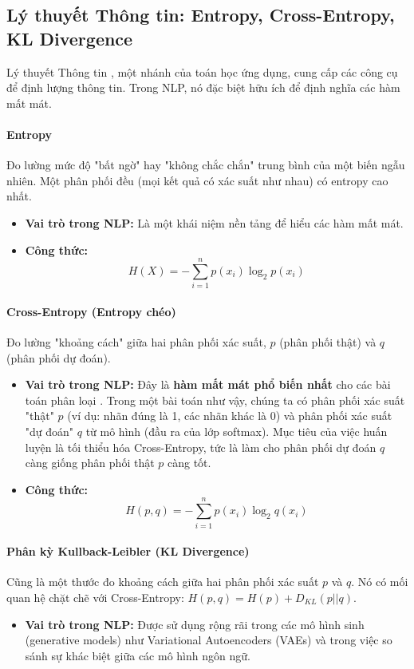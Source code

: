 \subsection{Lý thuyết Thông tin: Entropy, Cross-Entropy, KL Divergence}
\label{ssec:ly_thuyet_thong_tin}
Lý thuyết Thông tin \cite{shannon1948mathematical}, một nhánh của toán học ứng dụng, cung cấp các công cụ để định lượng thông tin. Trong NLP, nó đặc biệt hữu ích để định nghĩa các hàm mất mát.

\paragraph{Entropy}
Đo lường mức độ "bất ngờ" hay "không chắc chắn" trung bình của một biến ngẫu nhiên. Một phân phối đều (mọi kết quả có xác suất như nhau) có entropy cao nhất.
\begin{itemize}
    \item \textbf{Vai trò trong NLP:} Là một khái niệm nền tảng để hiểu các hàm mất mát.
    \item \textbf{Công thức:}
        \begin{equation}
            H(X) = -\sum_{i=1}^{n} p(x_i) \log_2 p(x_i)
            \label{eq:entropy}
        \end{equation}
\end{itemize}

\paragraph{Cross-Entropy (Entropy chéo)}
Đo lường "khoảng cách" giữa hai phân phối xác suất, $p$ (phân phối thật) và $q$ (phân phối dự đoán).
\begin{itemize}
    \item \textbf{Vai trò trong NLP:} Đây là \textbf{hàm mất mát phổ biến nhất} cho các bài toán phân loại \cite{goodfellow2016deep}. Trong một bài toán như vậy, chúng ta có phân phối xác suất "thật" $p$ (ví dụ: nhãn đúng là 1, các nhãn khác là 0) và phân phối xác suất "dự đoán" $q$ từ mô hình (đầu ra của lớp softmax). Mục tiêu của việc huấn luyện là tối thiểu hóa Cross-Entropy, tức là làm cho phân phối dự đoán $q$ càng giống phân phối thật $p$ càng tốt.
    \item \textbf{Công thức:}
        \begin{equation}
            H(p, q) = -\sum_{i=1}^{n} p(x_i) \log_2 q(x_i)
            \label{eq:cross_entropy}
        \end{equation}
\end{itemize}

\paragraph{Phân kỳ Kullback-Leibler (KL Divergence)}
Cũng là một thước đo khoảng cách giữa hai phân phối xác suất $p$ và $q$. Nó có mối quan hệ chặt chẽ với Cross-Entropy: $H(p, q) = H(p) + D_{KL}(p || q)$.
\begin{itemize}
    \item \textbf{Vai trò trong NLP:} Được sử dụng rộng rãi trong các mô hình sinh (generative models) như Variational Autoencoders (VAEs) và trong việc so sánh sự khác biệt giữa các mô hình ngôn ngữ.
\end{itemize}